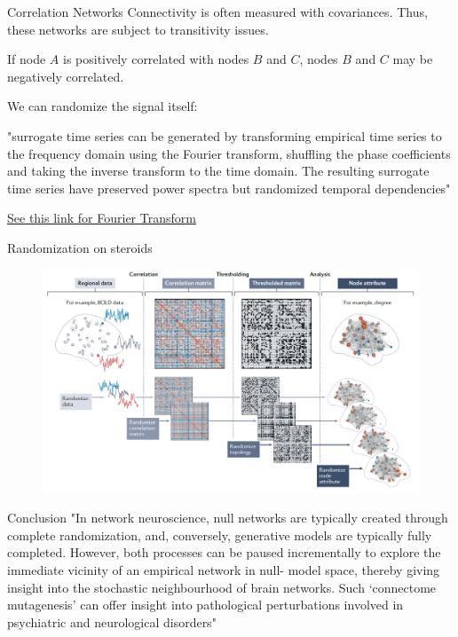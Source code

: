 \documentclass{beamer}
\begin{document}
\begin{frame}{Correlation Networks}
	Connectivity is often measured with covariances. Thus, these networks are subject to transitivity issues.
	
	If node $A$ is positively correlated with nodes $B$ and $C$, nodes $B$ and $C$ may be negatively correlated. 
	
	We can randomize the signal itself:
	
	"surrogate time series can be
	generated by transforming empirical time series to the
	frequency domain using the Fourier transform, shuffling
	the phase coefficients and taking the inverse transform
	to the time domain. The resulting surrogate time series
	have preserved power spectra but randomized temporal
	dependencies" 
	
	\href{https://www.thefouriertransform.com/}{See this link for Fourier Transform}
\end{frame}
\begin{frame}{Randomization on steroids}
	\begin{figure}[h]
		\centering
			\includegraphics[scale=0.4]{../Figures/fig_null_models_6.png}
	\end{figure}	
\end{frame}
\begin{frame}{Conclusion}
	"In network neuroscience, null networks
	are typically created through complete randomization,
	and, conversely, generative models are typically fully
	completed. However, both processes can be paused
	incrementally to explore the immediate vicinity of an
	empirical network in null- model space, thereby giving
	insight into the stochastic neighbourhood of brain networks.
	Such ‘connectome mutagenesis’ can offer insight
	into pathological perturbations involved in psychiatric
	and neurological disorders"
\end{frame}
\end{document}
